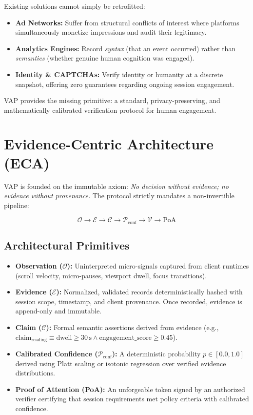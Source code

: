 \documentclass[10pt,twocolumn,letterpaper]{article}
\begin{document}
Existing solutions cannot simply be retrofitted:
\begin{itemize}
    \item \textbf{Ad Networks:} Suffer from structural conflicts of interest where platforms simultaneously monetize impressions and audit their legitimacy.
    \item \textbf{Analytics Engines:} Record \emph{syntax} (that an event occurred) rather than \emph{semantics} (whether genuine human cognition was engaged).
    \item \textbf{Identity \& CAPTCHAs:} Verify identity or humanity at a discrete snapshot, offering zero guarantees regarding ongoing session engagement.
\end{itemize}

VAP provides the missing primitive: a standard, privacy-preserving, and mathematically calibrated verification protocol for human engagement.

\section{Evidence-Centric Architecture (ECA)}
VAP is founded on the immutable axiom: \emph{No decision without evidence; no evidence without provenance.} The protocol strictly mandates a non-invertible pipeline:

\begin{equation*}
\mathcal{O} \longrightarrow \mathcal{E} \longrightarrow \mathcal{C} \longrightarrow \mathcal{P}_{\text{conf}} \longrightarrow \mathcal{V} \longrightarrow \text{PoA}
\end{equation*}

\subsection{Architectural Primitives}
\begin{itemize}
    \item \textbf{Observation ($\mathcal{O}$):} Uninterpreted micro-signals captured from client runtimes (scroll velocity, micro-pauses, viewport dwell, focus transitions).
    \item \textbf{Evidence ($\mathcal{E}$):} Normalized, validated records deterministically hashed with session scope, timestamp, and client provenance. Once recorded, evidence is append-only and immutable.
    \item \textbf{Claim ($\mathcal{C}$):} Formal semantic assertions derived from evidence (e.g., $\text{claim}_{\text{reading}} \equiv \text{dwell} \ge 30\,\text{s} \land \text{engagement\_score} \ge 0.45$).
    \item \textbf{Calibrated Confidence ($\mathcal{P}_{\text{conf}}$):} A deterministic probability $p \in [0.0, 1.0]$ derived using Platt scaling or isotonic regression over verified evidence distributions.
    \item \textbf{Proof of Attention (PoA):} An unforgeable token signed by an authorized verifier certifying that session requirements met policy criteria with calibrated confidence.
\end{itemize}
\end{document}

